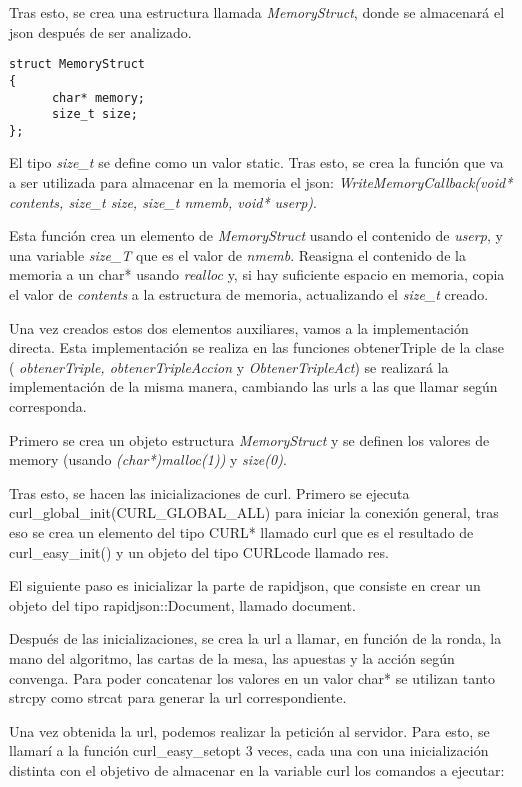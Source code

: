 Tras esto, se crea una estructura llamada  \textit{MemoryStruct}, donde se almacenará el json después de ser analizado.

\begin{verbatim}
struct MemoryStruct
{
      char* memory;
      size_t size;
};
\end{verbatim}

El tipo  \textit{size\_t} se define como un valor static. Tras esto, se crea la función que va a ser utilizada para almacenar en la memoria el json:  \textit{WriteMemoryCallback(void* contents, size\_t size, size\_t nmemb, void* userp)}.

Esta función crea un elemento de  \textit{MemoryStruct} usando el contenido de  \textit{userp}, y una variable  \textit{size\_T} que es el valor de  \textit{nmemb}. Reasigna el contenido de la memoria a un char* usando  \textit{realloc} y, si hay suficiente espacio en memoria, copia el valor de  \textit{contents} a la estructura de memoria, actualizando el  \textit{size\_t} creado.

Una vez creados estos dos elementos auxiliares, vamos a la implementación directa. Esta implementación se realiza en las funciones obtenerTriple de la clase ( \textit{obtenerTriple, obtenerTripleAccion} y  \textit{ObtenerTripleAct}) se realizará la implementación de la misma manera, cambiando las urls a las que llamar según corresponda.

Primero se crea un objeto estructura  \textit{MemoryStruct} y se definen los valores de memory (usando \textit{(char*)malloc(1))} y\textit{ size(0)}.

Tras esto, se hacen las inicializaciones de curl. Primero se ejecuta \linebreak
 curl\_global\_init(CURL\_GLOBAL\_ALL) para iniciar la conexión general, tras eso se crea un elemento del tipo CURL* llamado curl que es el resultado de curl\_easy\_init() y un objeto del tipo CURLcode llamado res.
 
 El siguiente paso es inicializar la parte de rapidjson, que consiste en crear un objeto del tipo rapidjson::Document, llamado document.

Después de las inicializaciones, se crea la url a llamar, en función de la ronda, la mano del algoritmo, las cartas de la mesa, las apuestas y la acción según convenga. Para poder concatenar los valores en un valor char* se utilizan tanto strcpy como strcat para generar la url correspondiente.

Una vez obtenida la url, podemos realizar la petición al servidor. Para esto, se llamarí a la función curl\_easy\_setopt 3 veces, cada una con una inicialización distinta con el objetivo de almacenar en la variable curl los comandos a ejecutar:

